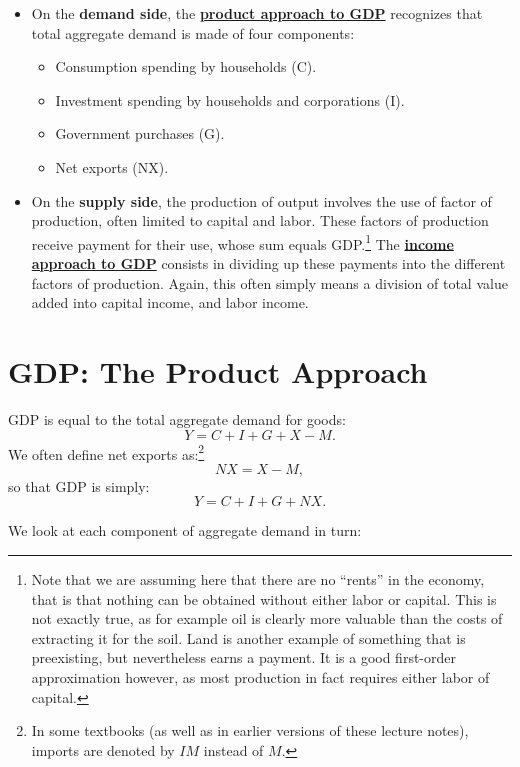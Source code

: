 \documentclass[]{book}
\providecommand{\tightlist}{%
  \setlength{\itemsep}{0pt}\setlength{\parskip}{0pt}}
\let\rmarkdownfootnote\footnote%
\def\footnote{\protect\rmarkdownfootnote}
\theoremstyle{definition}
\theoremstyle{definition}
\theoremstyle{definition}
\theoremstyle{remark}
\begin{document}
\begin{itemize}
\tightlist
\item
  On the \textbf{demand side}, the
  \protect\hyperlink{gdp-product}{\textbf{product approach to GDP}}
  recognizes that total aggregate demand is made of four components:

  \begin{itemize}
  \tightlist
  \item
    Consumption spending by households (C).
  \item
    Investment spending by households and corporations (I).
  \item
    Government purchases (G).
  \item
    Net exports (NX).
  \end{itemize}
\item
  On the \textbf{supply side}, the production of output involves the use
  of factor of production, often limited to capital and labor. These
  factors of production receive payment for their use, whose sum equals
  GDP.\footnote{Note that we are assuming here that there are no
    ``rents'' in the economy, that is that nothing can be obtained
    without either labor or capital. This is not exactly true, as for
    example oil is clearly more valuable than the costs of extracting it
    for the soil. Land is another example of something that is
    preexisting, but nevertheless earns a payment. It is a good
    first-order approximation however, as most production in fact
    requires either labor of capital.} The
  \protect\hyperlink{gdp-income}{\textbf{income approach to GDP}}
  consists in dividing up these payments into the different factors of
  production. Again, this often simply means a division of total value
  added into capital income, and labor income.
\end{itemize}

\hypertarget{gdp-product}{\section{GDP: The Product
Approach}\label{gdp-product}}

GDP is equal to the total aggregate demand for goods:
\[ Y = C + I + G + X -M.\] We often define net exports as:\footnote{In
  some textbooks (as well as in earlier versions of these lecture
  notes), imports are denoted by \(IM\) instead of \(M\).} \[NX = X-M,\]
so that GDP is simply: \[ Y = C + I + G + NX.\]

We look at each component of aggregate demand in turn:
\end{document}
